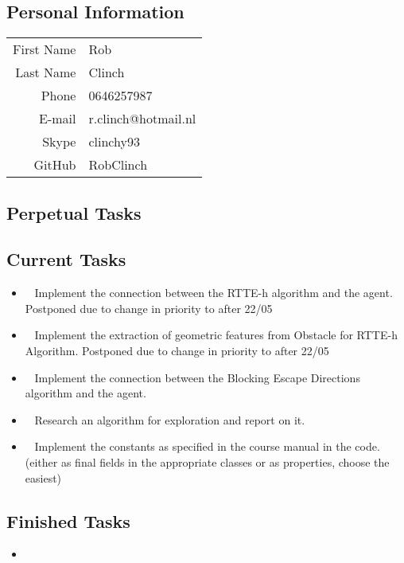 \subsection{Personal Information}
\begin{table}[h!]
	\begin{tabular}{rl}
	First Name 	& Rob\\
	Last Name	& Clinch\\
	Phone		& 0646257987\\
	E-mail		& r.clinch@hotmail.nl\\
	Skype		& clinchy93\\
	GitHub		& RobClinch
\end{tabular}
\end{table}

\subsection{Perpetual Tasks}

\subsection{Current Tasks}
\begin{itemize}
	\item~
	Implement the connection between the RTTE-h algorithm and the agent.
		\subitem Postponed due to change in priority to after 22/05
	\item~
	Implement the extraction of geometric features from Obstacle for RTTE-h Algorithm.
		\subitem Postponed due to change in priority to after 22/05
	\item~
		Implement the connection between the Blocking Escape Directions algorithm and the agent.
	\item~
		Research an algorithm for exploration and report on it.
	\item~
		Implement the constants as specified in the course manual in the code. (either as final fields in the appropriate classes or as properties, choose the easiest)
\end{itemize}

\subsection{Finished Tasks}
\begin{itemize}
\item
\end{itemize}
